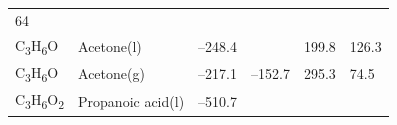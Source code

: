 \documentclass[
]{book}
\theoremstyle{definition}
\theoremstyle{definition}
\theoremstyle{definition}
\theoremstyle{remark}
\begin{document}
\begin{longtable}[]{@{}llllll@{}}
\begin{minipage}[t]{0.14\columnwidth}
64\strut
\end{minipage}\tabularnewline
\begin{minipage}[t]{0.07\columnwidth}\raggedright
C\textsubscript{3}H\textsubscript{6}O\strut
\end{minipage} & \begin{minipage}[t]{0.17\columnwidth}\raggedright
Acetone(l)\strut
\end{minipage} & \begin{minipage}[t]{0.15\columnwidth}\raggedright
--248.4\strut
\end{minipage} & \begin{minipage}[t]{0.15\columnwidth}\raggedright
\strut
\end{minipage} & \begin{minipage}[t]{0.14\columnwidth}\raggedright
199.8\strut
\end{minipage} & \begin{minipage}[t]{0.14\columnwidth}\raggedright
126.3\strut
\end{minipage}\tabularnewline
\begin{minipage}[t]{0.07\columnwidth}\raggedright
C\textsubscript{3}H\textsubscript{6}O\strut
\end{minipage} & \begin{minipage}[t]{0.17\columnwidth}\raggedright
Acetone(g)\strut
\end{minipage} & \begin{minipage}[t]{0.15\columnwidth}\raggedright
--217.1\strut
\end{minipage} & \begin{minipage}[t]{0.15\columnwidth}\raggedright
--152.7\strut
\end{minipage} & \begin{minipage}[t]{0.14\columnwidth}\raggedright
295.3\strut
\end{minipage} & \begin{minipage}[t]{0.14\columnwidth}\raggedright
74.5\strut
\end{minipage}\tabularnewline
\begin{minipage}[t]{0.07\columnwidth}\raggedright
C\textsubscript{3}H\textsubscript{6}O\textsubscript{2}\strut
\end{minipage} & \begin{minipage}[t]{0.17\columnwidth}\raggedright
Propanoic acid(l)\strut
\end{minipage} & \begin{minipage}[t]{0.15\columnwidth}\raggedright
--510.7\strut
\end{minipage} & \begin{minipage}[t]{0.15\columnwidth}\raggedright

\end{minipage}
\end{longtable}
\end{document}
